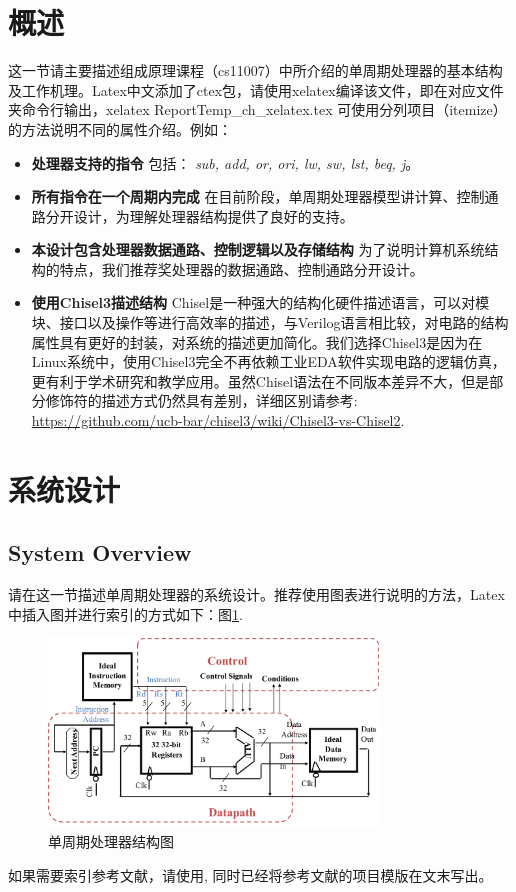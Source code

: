 \documentclass[a4paper]{article}
\begin{document}
\section{概述} \label{overview}%
这一节请主要描述组成原理课程（cs11007）中所介绍的单周期处理器的基本结构及工作机理。Latex中文添加了ctex包，请使用xelatex编译该文件，即在对应文件夹命令行输出，xelatex ReportTemp\_ch\_xelatex.tex
可使用分列项目（itemize）的方法说明不同的属性介绍。例如：
\begin{itemize}
	\item{\textbf{处理器支持的指令} 包括： \emph{sub, add, or, ori, lw, sw, lst, beq, j}。}
    \item{\textbf{所有指令在一个周期内完成} 在目前阶段，单周期处理器模型讲计算、控制通路分开设计，为理解处理器结构提供了良好的支持。}
    \item{\textbf{本设计包含处理器数据通路、控制逻辑以及存储结构} 为了说明计算机系统结构的特点，我们推荐奖处理器的数据通路、控制通路分开设计。}
    \item{\textbf{使用Chisel3描述结构} Chisel是一种强大的结构化硬件描述语言，可以对模块、接口以及操作等进行高效率的描述，与Verilog语言相比较，对电路的结构属性具有更好的封装，对系统的描述更加简化。我们选择Chisel3是因为在Linux系统中，使用Chisel3完全不再依赖工业EDA软件实现电路的逻辑仿真，更有利于学术研究和教学应用。虽然Chisel语法在不同版本差异不大，但是部分修饰符的描述方式仍然具有差别，详细区别请参考: \url{https://github.com/ucb-bar/chisel3/wiki/Chisel3-vs-Chisel2}.}
\end{itemize}


\newpage
\section{系统设计} \label{sysdes}%
\subsection{System Overview}\label{sub:sysover}
请在这一节描述单周期处理器的系统设计。推荐使用图表进行说明的方法，Latex中插入图并进行索引的方式如下：图\ref{fig:singleblock}. 
\begin{figure}[ht]
 \centering
 \includegraphics[height=5cm]{images/l1sys.pdf}
 \caption{单周期处理器结构图}
 \label{fig:singleblock}
\end{figure}
如果需要索引参考文献，请使用\cite{Erdos01}, 同时已经将参考文献的项目模版在文末写出。
\end{document}
